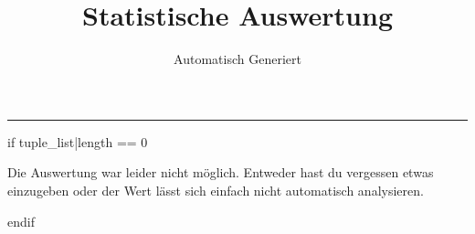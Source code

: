 \documentclass{article}
\title{Statistische Auswertung}
\author{Automatisch Generiert}
\date{\VAR{date_generated}}
\newcommand{\BLOCK}[1]{#1}
\newcommand{\MyFormBox}[3][1.0cm]{%
    \begin{mdframed}[style=MyFormStyle]%
    {\noindent\footnotesize#2 \vspace*{1em} \par\normalsize #3}
        \vspace*{#1}%
    \end{mdframed}%
}
\begin{document}
    \maketitle

    \par\noindent\rule{\textwidth}{0.4pt}



    \BLOCK{if tuple_list|length == 0}
    \begin{center} Die Auswertung war leider nicht möglich. Entweder hast du vergessen etwas einzugeben oder der Wert lässt sich einfach nicht automatisch analysieren. \end{center}
    \BLOCK{endif}
\end{document}
